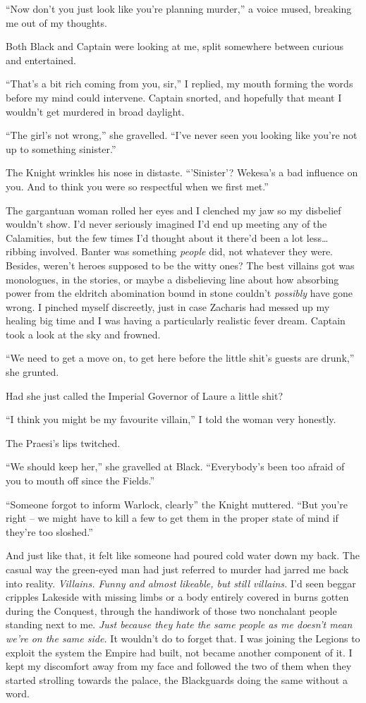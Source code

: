 \documentclass[12pt, openany]{book}
\begin{document}
“Now don’t you just look like you’re planning murder,” a voice mused, breaking me out of my thoughts.

Both Black and Captain were looking at me, split somewhere between curious and entertained.

“That’s a bit rich coming from you, sir,” I replied, my mouth forming the words before my mind could intervene. Captain snorted, and hopefully that meant I wouldn’t get murdered in broad daylight.

“The girl’s not wrong,” she gravelled. “I’ve never seen you looking like you’re not up to something sinister.”

The Knight wrinkles his nose in distaste. “’Sinister’? Wekesa’s a bad influence on you. And to think you were so respectful when we first met.”

The gargantuan woman rolled her eyes and I clenched my jaw so my disbelief wouldn’t show. I’d never seriously imagined I’d end up meeting any of the Calamities, but the few times I’d thought about it there’d been a lot less… ribbing involved. Banter was something \textit{people} did, not whatever they were. Besides, weren’t heroes supposed to be the witty ones? The best villains got was monologues, in the stories, or maybe a disbelieving line about how absorbing power from the eldritch abomination bound in stone couldn’t \textit{possibly} have gone wrong. I pinched myself discreetly, just in case Zacharis had messed up my healing big time and I was having a particularly realistic fever dream. Captain took a look at the sky and frowned.

“We need to get a move on, to get here before the little shit’s guests are drunk,” she grunted.

Had she just called the Imperial Governor of Laure a little shit?

“I think you might be my favourite villain,” I told the woman very honestly.

The Praesi’s lips twitched.

“We should keep her,” she gravelled at Black. “Everybody’s been too afraid of you to mouth off since the Fields.”

“Someone forgot to inform Warlock, clearly” the Knight muttered. “But you’re right – we might have to kill a few to get them in the proper state of mind if they’re too sloshed.” 

And just like that, it felt like someone had poured cold water down my back. The casual way the green-eyed man had just referred to murder had jarred me back into reality. \textit{Villains. Funny and almost likeable, but still villains.} I’d seen beggar cripples Lakeside with missing limbs or a body entirely covered in burns gotten during the Conquest, through the handiwork of those two nonchalant people standing next to me. \textit{Just because they hate the same people as me doesn’t mean we’re on the same side.} It wouldn’t do to forget that. I was joining the Legions to exploit the system the Empire had built, not became another component of it. I kept my discomfort away from my face and followed the two of them when they started strolling towards the palace, the Blackguards doing the same without a word.
\end{document}
